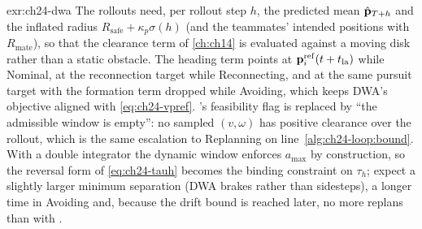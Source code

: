 \begin{solution}{exr:ch24-dwa}
The rollouts need, per rollout step $h$, the predicted mean $\hat{\mathbf{p}}_{T+h}$ and the inflated radius $R_{\mathrm{safe}} + \kappa_p\sigma(h)$ (and the teammates' intended positions with $R_{\mathrm{mate}}$), so that the clearance term of \cref{ch:ch14} is evaluated against a moving disk rather than a static obstacle. The heading term points at $\mathbf{p}^{\mathrm{ref}}_i(t + t_{\mathrm{la}})$ while Nominal, at the reconnection target while Reconnecting, and at the same pursuit target with the formation term dropped while Avoiding, which keeps DWA's objective aligned with \cref{eq:ch24-vpref}. \orca's feasibility flag is replaced by ``the admissible window is empty'': no sampled $(v,\omega)$ has positive clearance over the rollout, which is the same escalation to Replanning on line~\ref{alg:ch24-loop:bound}. With a double integrator the dynamic window enforces $a_{\max}$ by construction, so the reversal form of \cref{eq:ch24-tauh} becomes the binding constraint on $\tau_h$; expect a slightly larger minimum separation (DWA brakes rather than sidesteps), a longer time in Avoiding and, because the drift bound is reached later, no more replans than with \orca.
\end{solution}
